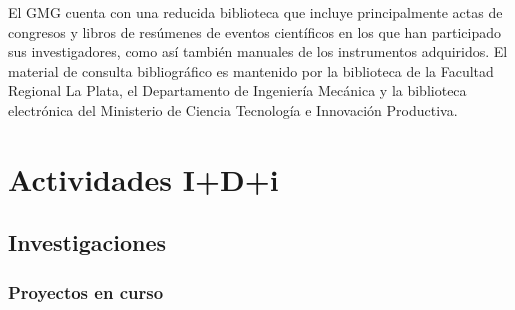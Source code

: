 \documentclass[a4paper,11pt,twoside,final,titlepage,onecolumn,openright]{report}
\begin{document}
El GMG cuenta con una reducida biblioteca que incluye principalmente actas de congresos y libros de resúmenes de eventos científicos en los que han participado sus investigadores, como así también manuales de los instrumentos adquiridos. El material de consulta bibliográfico es mantenido por la biblioteca de la Facultad Regional La Plata, el Departamento de Ingeniería Mecánica y la biblioteca electrónica del Ministerio de Ciencia Tecnología e Innovación Productiva. 

\chapter{Actividades I+D+i}

\section{Investigaciones}

\subsection{Proyectos en curso}
\end{document}
